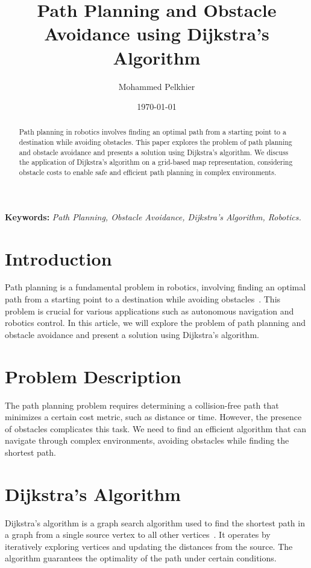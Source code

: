 \documentclass{article}
\begin{document}
\title{Path Planning and Obstacle Avoidance using Dijkstra's Algorithm}
\author{Mohammed Pelkhier}
\date{\today}

\maketitle


\begin{abstract}
Path planning in robotics involves finding an optimal path from a starting point to a destination while avoiding obstacles. This paper explores the problem of path planning and obstacle avoidance and presents a solution using Dijkstra's algorithm. We discuss the application of Dijkstra's algorithm on a grid-based map representation, considering obstacle costs to enable safe and efficient path planning in complex environments.
\end{abstract}

\vspace{12pt}

\textbf{Keywords:} {\small{\textit{Path Planning, Obstacle Avoidance, Dijkstra's Algorithm, Robotics.}}}

\section{Introduction}
Path planning is a fundamental problem in robotics, involving finding an optimal path from a starting point to a destination while avoiding obstacles~\cite{lavalle2006}. This problem is crucial for various applications such as autonomous navigation and robotics control. In this article, we will explore the problem of path planning and obstacle avoidance and present a solution using Dijkstra's algorithm.

\section{Problem Description}
The path planning problem requires determining a collision-free path that minimizes a certain cost metric, such as distance or time. However, the presence of obstacles complicates this task. We need to find an efficient algorithm that can navigate through complex environments, avoiding obstacles while finding the shortest path.

\section{Dijkstra's Algorithm}
Dijkstra's algorithm is a graph search algorithm used to find the shortest path in a graph from a single source vertex to all other vertices~\cite{dijkstra1959}. It operates by iteratively exploring vertices and updating the distances from the source. The algorithm guarantees the optimality of the path under certain conditions.
\end{document}
